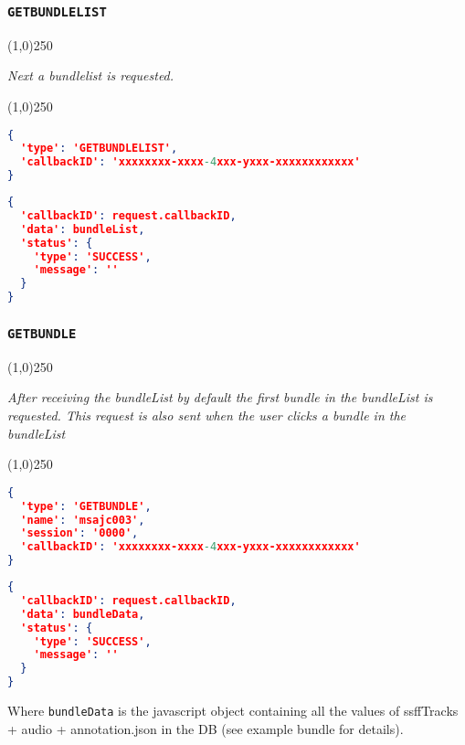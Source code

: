 \documentclass[A4,12pt, utf8]{article}
\begin{document}
\subsubsection{\texttt{GETBUNDLELIST}}
\begin{center}
  \line(1,0){250}

  \textit{Next a bundlelist is requested.}

  \line(1,0){250}
\end{center}


\begin{lstlisting}[caption=Request content, language=json]
{
  'type': 'GETBUNDLELIST', 
  'callbackID': 'xxxxxxxx-xxxx-4xxx-yxxx-xxxxxxxxxxxx'
}
\end{lstlisting}

\begin{lstlisting}[caption=Reply content, language=json]
{
  'callbackID': request.callbackID,
  'data': bundleList,
  'status': {
    'type': 'SUCCESS',
    'message': ''
  }
}
\end{lstlisting}

\subsubsection{\texttt{GETBUNDLE}}
\begin{center}
  \line(1,0){250}

  \textit{After receiving the bundleList by default the first bundle in the bundleList is requested. This request is also sent when the user clicks a bundle in the bundleList}

  \line(1,0){250}
\end{center}


\begin{lstlisting}[caption=Request content, language=json]
{
  'type': 'GETBUNDLE',
  'name': 'msajc003',
  'session': '0000',
  'callbackID': 'xxxxxxxx-xxxx-4xxx-yxxx-xxxxxxxxxxxx'
}
\end{lstlisting}

\begin{lstlisting}[caption=Reply content, language=json]
{
  'callbackID': request.callbackID,
  'data': bundleData,
  'status': {
    'type': 'SUCCESS',
    'message': ''
  }
}
\end{lstlisting}
Where \texttt{bundleData} is the javascript object containing all the values of ssffTracks + audio + annotation.json in the DB (see example bundle for details).

\end{document}
